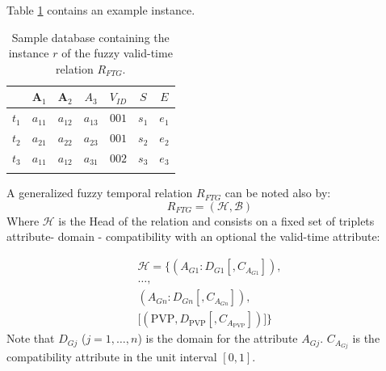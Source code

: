 \documentclass{llncs}
\newcommand{\Head}{\mathcal{H}}
\newcommand{\Body}{\mathcal{B}}
\newcommand{\A}{\mathcal{A}}
\newcommand{\I}{\mathcal{I}}
\begin{document}
\begin{definition}
Table \ref{tbl:fuzzy-sample-definitions} contains an example instance.


\begin{table}
\caption{\label{tbl:fuzzy-sample-definitions}Sample database containing the instance $r$ of the fuzzy valid-time relation $R_{FTG}$.}
\centering
\begin{tabular}{c c c c c c c}\\
\hline
& \textbf{A$_1$}  & \textbf{A$_2$}  & $A_3$ & $V_{ID}$ & $S$ & $E$ \\
\hline
$t_1$&$a_{11}$ & $a_{12}$ & $a_{13}$ & $001$ & $s_1$ & $e_1$ \\
$t_2$ & $a_{21}$ & $a_{22}$ & $a_{23}$& $001$ &  $s_2$ & $e_2$ \\
$t_3$ & $a_{11}$ & $a_{12}$ & $a_{31}$& $002$ & $s_3$ & $e_3$\\
\hline\\
\end{tabular}
\end{table}



% 
% 
% 
% 
 A generalized fuzzy temporal relation $R_{FTG}$ can be noted also by:
\label{def:generalized-fuzzy-temporal-relation}
\begin{equation}
\label{eq:generalized-fuzzy-temporal-relation}
R_{FTG} = \left(\Head, \Body \right)
\end{equation}
Where $\Head$ is the Head of the relation and consists on a fixed set of triplets attribute- domain - compatibility with an optional the valid-time attribute:

\begin{align}
\label{eq:head-valid-time}
\Head = \big \lbrace \left(A_{G1}:D_{G1}\left[,C_{A_{G1}} \right] \right),\\
\nonumber
 \ldots,\\
 \nonumber
  \left(A_{Gn}:D_{Gn}\left[,C_{A_{Gn}} \right] \right),\\
  \nonumber
  \Big[  \left( \text{PVP}, D_{\text{PVP}}\left[,C_{A_{\text{PVP}}} \right] \right) \Big] \big \rbrace
\end{align}
Note that $D_{Gj}$ ($j = 1, \ldots, n$) is the domain for the attribute $A_{Gj}$. $C_{A_{Gj}}$ is the compatibility attribute in the unit interval $\left[0, 1 \right]$.


\end{definition}
\end{document}
